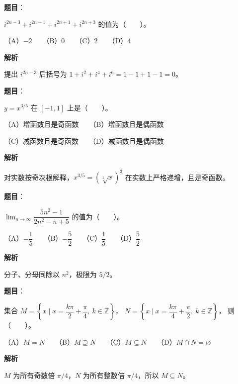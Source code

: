\begin{answer}

\textbf{题目}：

$i^{2n-3}+i^{2n-1}+i^{2n+1}+i^{2n+3}$ 的值为\mbox{（　　）}。

（A）$-2$　　（B）$0$　　（C）$2$　　（D）$4$

\textbf{解析}

提出 $i^{2n-3}$ 后括号为 $1+i^2+i^4+i^6=1-1+1-1=0$。


\end{answer}
\begin{answer}

\textbf{题目}：

$y=x^{3/5}$ 在 $[-1,1]$ 上是\mbox{（　　）}。

（A）增函数且是奇函数　　（B）增函数且是偶函数

（C）减函数且是奇函数　　（D）减函数且是偶函数

\textbf{解析}

对实数按奇次根解释，$x^{3/5}=(\sqrt[5]x)^3$ 在实数上严格递增，且是奇函数。


\end{answer}
\begin{answer}

\textbf{题目}：

$\displaystyle\lim_{n\to\infty}\dfrac{5n^2-1}{2n^2-n+5}$ 的值为\mbox{（　　）}。

（A）$-\dfrac15$　　（B）$-\dfrac52$　　（C）$\dfrac15$　　（D）$\dfrac52$

\textbf{解析}

分子、分母同除以 $n^2$，极限为 $5/2$。


\end{answer}
\begin{answer}

\textbf{题目}：

集合
$M=\left\{x\mid x=\dfrac{k\pi}{2}+\dfrac\pi4,\ k\in\mathbb Z\right\}$，
$N=\left\{x\mid x=\dfrac{k\pi}{4}+\dfrac\pi2,\ k\in\mathbb Z\right\}$，
则\mbox{（　　）}。

（A）$M=N$　　（B）$M\supseteq N$　　（C）$M\subseteq N$　　（D）$M\cap N=\varnothing$

\textbf{解析}

$M$ 为所有奇数倍 $\pi/4$，$N$ 为所有整数倍 $\pi/4$，所以 $M\subseteq N$。


\end{answer}
